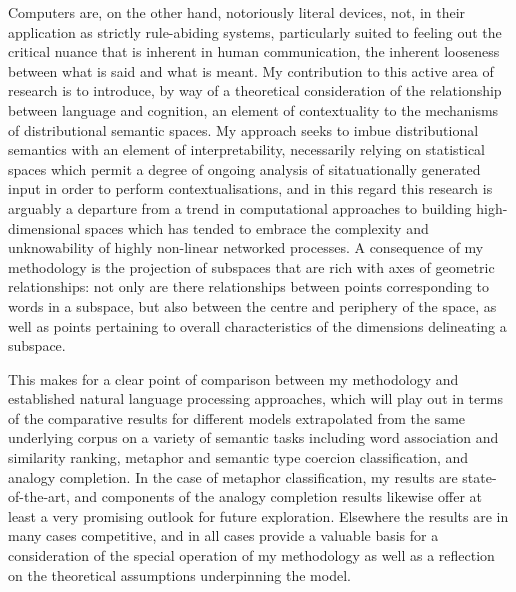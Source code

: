 Computers are, on the other hand, notoriously literal devices, not, in their application as strictly rule-abiding systems, particularly suited to feeling out the critical nuance that is inherent in human communication, the inherent looseness between what is said and what is meant.  My contribution to this active area of research is to introduce, by way of a theoretical consideration of the relationship between language and cognition, an element of contextuality to the mechanisms of distributional semantic spaces.  My approach seeks to imbue distributional semantics with an element of interpretability, necessarily relying on statistical spaces which permit a degree of ongoing analysis of sitatuationally generated input in order to perform contextualisations, and in this regard this research is arguably a departure from a trend in computational approaches to building high-dimensional spaces which has tended to embrace the complexity and unknowability of highly non-linear networked processes.  A consequence of my methodology is the projection of subspaces that are rich with axes of geometric relationships: not only are there relationships between points corresponding to words in a subspace, but also between the centre and periphery of the space, as well as points pertaining to overall characteristics of the dimensions delineating a subspace.

This makes for a clear point of comparison between my methodology and established natural language processing approaches, which will play out in terms of the comparative results for different models extrapolated from the same underlying corpus on a variety of semantic tasks including word association and similarity ranking, metaphor and semantic type coercion classification, and analogy completion.  In the case of metaphor classification, my results are state-of-the-art, and components of the analogy completion results likewise offer at least a very promising outlook for future exploration.  Elsewhere the results are in many cases competitive, and in all cases provide a valuable basis for a consideration of the special operation of my methodology as well as a reflection on the theoretical assumptions underpinning the model.

